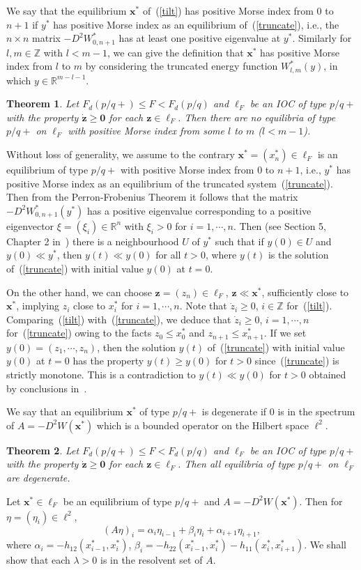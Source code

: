 \documentclass[12pt]{article}
\newcommand{\R}{\mathbb{R}}
\newcommand{\Z}{\mathbb{Z}}
\newcounter{number}
\newtheorem{theorem}{Theorem}
\newcommand{\begth}{\begin{theorem}\hspace{1em}}
\newcommand{\eeth}{\end{theorem}
   \addtocounter{number}{1}}
\newcommand{\begeq}{\begin{equation}}
\newcommand{\eeq}{\end{equation}}
\newcommand{\emark}{\hfill\hspace{1em}\framebox[0.5em]{\rule{0cm}{0em}}
\vspace{2mm}}
\newcommand{\refer}[1]{~(\ref{#1})}
\newcommand{\zbf}{{\mathbf{z}}}
\newcommand{\xbf}{{\mathbf{x}}}
\newcommand{\zero}{{\mathbf{0}}}
\newcommand{\pf}{{\bf Proof:}\hspace{1em}}
\begin{document}
We say that the equilibrium $\xbf^*$ of\refer{tilt} has positive Morse index from $0$ to $n+1$ if $y^*$ has positive Morse index as an equilibrium of\refer{truncate}, i.e., the $n\times n$ matrix $-D^2W_{0,n+1}^*$ has at least one positive eigenvalue at $y^*$. Similarly for $l,m\in\Z$ with $l<m-1$, we can give the definition that $\xbf^*$ has positive Morse index from $l$ to $m$ by considering the truncated energy function $W_{l,m}^*(y)$, in which $y\in\R^{m-l-1}$.

\begth\label{posi-index-p/q+}
Let $F_d(p/q+)\leq F<F_d(p/q)$ and $\ell_F$ be an IOC of type $p/q+$ with the property $\dot{\zbf}\geq\zero$ for each $\zbf\in\ell_F$. Then there are no equilibria of type $p/q+$ on $\ell_F$ with positive Morse index from some $l$ to $m$ ($l<m-1$).
\eeth
\noindent\pf
Without  loss of generality, we assume to the contrary $\xbf^*=(x_n^*)\in\ell_F$ is an equilibrium of type $p/q+$ with positive Morse index from $0$ to $n+1$, i.e., $y^*$ has positive Morse index as an equilibrium of the truncated system\refer{truncate}. Then from the Perron-Frobenius Theorem it follows that the matrix $-D^2W_{0,n+1}^*(y^*)$ has a positive eigenvalue corresponding to a positive eigenvector $\xi=(\xi_i)\in\R^n$ with $\xi_i>0$ for $i=1,\cdots,n$. Then (see Section 5, Chapter 2 in~\cite{Sm}) there is a neighbourhood $U$ of $y^*$ such that if $y(0)\in U$ and $y(0)\ll y^*$, then $y(t)\ll y(0)$ for all $t>0$, where $y(t)$ is the solution of\refer{truncate} with initial value $y(0)$ at $t=0$.

On the other hand, we can choose $\zbf=(z_n)\in\ell_F$, $\zbf\ll\xbf^*$, sufficiently close to $\xbf^*$, implying $z_i$ close to $x_i^*$ for $i=1,\cdots,n$. Note that $\dot{z}_i\geq 0$, $i\in\Z$ for\refer{tilt}. Comparing\refer{tilt} with\refer{truncate}, we deduce that $\dot{z}_i\geq 0$, $i=1,\cdots, n$ for\refer{truncate} owing to the facts $z_0\leq x_0^*$ and $z_{n+1}\leq x_{n+1}^*$. If we set $y(0)=(z_1,\cdots,z_n)$, then the solution $y(t)$ of\refer{truncate} with initial value $y(0)$ at $t=0$ has the property $y(t)\geq y(0)$ for $t>0$ since\refer{truncate} is strictly monotone. This is a contradiction to $y(t)\ll y(0)$ for $t>0$ obtained by conclusions in~\cite{Sm}.\emark


We say that an equilibrium $\xbf^*$ of type $p/q+$ is degenerate if $0$ is in the spectrum of $A=-D^2W(\xbf^*)$ which is a bounded operator on the Hilbert space $\ell^2$.


\begth\label{degenerate-p/q+}
Let $F_d(p/q+)\leq F<F_d(p/q)$ and $\ell_F$ be an IOC of type $p/q+$ with the property $\dot{\zbf}\geq\zero$ for each $\zbf\in\ell_F$. Then all equilibria of type $p/q+$ on $\ell_F$ are degenerate.
\eeth
\noindent\pf
Let $\xbf^*\in\ell_F$ be an equilibrium of type $p/q+$ and $A=-D^2W(\xbf^*)$.  Then for $\eta=(\eta_i)\in\ell^2$,
\begeq\label{Aeta}
(A\eta)_i=\alpha_i\eta_{i-1}+\beta_i\eta_i+\alpha_{i+1}\eta_{i+1},
\eeq
where $\alpha_i=-h_{12}(x_{i-1}^*,x_i^*)$, $\beta_i=-h_{22}(x_{i-1}^*,x_i^*)-h_{11}(x_i^*,x_{i+1}^*)$. We shall show that each $\lambda>0$ is in the resolvent set of $A$.
\end{document}
